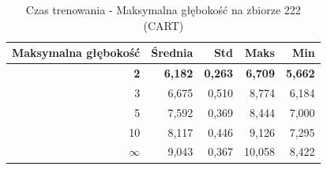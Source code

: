 \begin{table}[htbp]
\centering
\small
\setlength{\tabcolsep}{6pt}
\renewcommand{\arraystretch}{1.2}
\caption{Czas trenowania - Maksymalna głębokość na zbiorze 222 (CART)}
\label{tab:CART_max_depth_222_time}
\begin{tabular}{r|r|r|r|r}
\toprule
Maksymalna głębokość & Średnia & Std & Maks & Min \\
\hline
\textbf{2} & \textbf{6,182} & \textbf{0,263} & \textbf{6,709} & \textbf{5,662} \\
3 & 6,675 & 0,510 & 8,774 & 6,184 \\
5 & 7,592 & 0,369 & 8,444 & 7,000 \\
10 & 8,117 & 0,446 & 9,126 & 7,295 \\
$\infty$ & 9,043 & 0,367 & 10,058 & 8,422 \\
\bottomrule
\end{tabular}
\end{table}